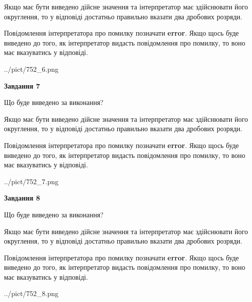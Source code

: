 \documentclass[12pt, ukrainian]{article}
\begin{document}
{\begin {Large}
Якщо має бути виведено дійсне значення та інтерпретатор має здійснювати його округлення, 
то у відповіді достатньо правильно вказати два дробових розряди.

Повідомлення інтерпретатора про помилку позначати \textbf{error}.
Якщо щось буде виведено до того, як інтерпретатор видасть повідомлення про помилку, 
то воно має вказуватись у відповіді. \par

\begin{center}
	{../pict/752_6.png}
\end{center}
\newpage

{\begin {center}\textbf{Завдання 7}\end {center}}\par
Що буде виведено за виконання? \par

Якщо має бути виведено дійсне значення та інтерпретатор має здійснювати його округлення, 
то у відповіді достатньо правильно вказати два дробових розряди.

Повідомлення інтерпретатора про помилку позначати \textbf{error}.
Якщо щось буде виведено до того, як інтерпретатор видасть повідомлення про помилку, 
то воно має вказуватись у відповіді. \par

\begin{center}
	{../pict/752_7.png}
\end{center}
\newpage

{\begin {center}\textbf{Завдання 8}\end {center}}\par
Що буде виведено за виконання? \par

Якщо має бути виведено дійсне значення та інтерпретатор має здійснювати його округлення, 
то у відповіді достатньо правильно вказати два дробових розряди.

Повідомлення інтерпретатора про помилку позначати \textbf{error}.
Якщо щось буде виведено до того, як інтерпретатор видасть повідомлення про помилку, 
то воно має вказуватись у відповіді. \par

\begin{center}
	{../pict/752_8.png}
\end{center}
\newpage


\end{Large}}
\end{document}
